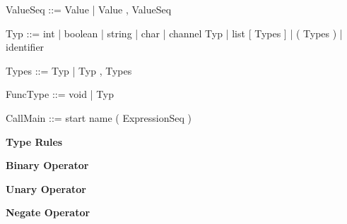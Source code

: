 \documentclass[11pt]{report}
\begin{document}
\begin{verbnobox}[\normalfont]
ValueSeq ::= Value | Value , ValueSeq
\end{verbnobox}
\vspace*{3pt}

\begin{verbnobox}[\normalfont]
Typ ::= int
      | boolean
      | string
      | char
      | channel Typ
      | list [ Types ]
      | ( Types )
      | identifier
\end{verbnobox}
\vspace*{3pt}

\begin{verbnobox}[\normalfont]
Types ::= Typ | Typ , Types
\end{verbnobox}
\vspace*{3pt}

\begin{verbnobox}[\normalfont]
FuncType ::= void | Typ
\end{verbnobox}
\vspace*{3pt}

\begin{verbnobox}[\normalfont]
CallMain ::= start name ( ExpressionSeq )
\end{verbnobox}
\vspace*{3pt}

\newpage
\centerline{\textbf{\Huge Type Rules}}
\vspace*{3pt}
\vspace*{20pt}


\tabto{0cm} {\large \textbf{Binary Operator}}
\begin{prooftree}
\end{prooftree}

\tabto{0cm} {\large \textbf{Unary Operator}}
\begin{prooftree}
\end{prooftree}

\tabto{0cm} {\large \textbf{Negate Operator}}
\begin{prooftree}
\end{prooftree}
\end{document}
